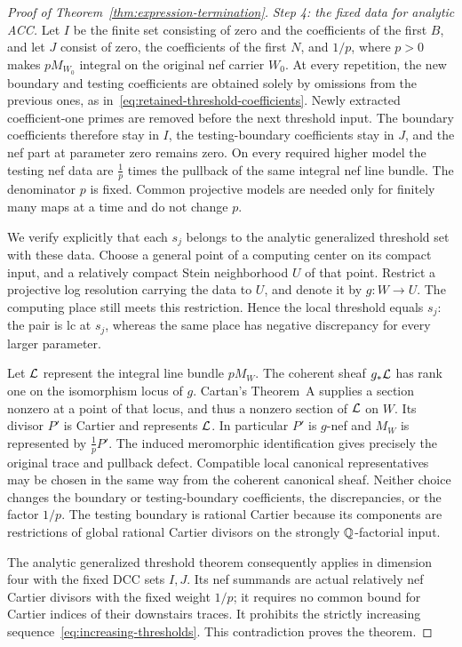 \begin{proof}[Proof of Theorem~\ref{thm:expression-termination}]
\smallskip\noindent
\emph{Step 4: the fixed data for analytic ACC.}
Let $I$ be the finite set consisting of zero and the coefficients of the
first $B$, and let $J$ consist of zero, the coefficients of the first
$N$, and $1/p$, where $p>0$ makes $pM_{W_0}$ integral on the
original nef carrier $W_0$.  At every repetition, the new boundary and testing
coefficients are obtained solely by omissions from the previous ones,
as in~\eqref{eq:retained-threshold-coefficients}.  Newly extracted
coefficient-one primes are removed before the next threshold input.
The boundary coefficients therefore stay in $I$, the testing-boundary
coefficients stay in $J$, and the nef part at parameter zero remains
zero.  On every required higher model the testing nef data are
$\frac1p$ times the pullback of the same integral nef line bundle.
The denominator $p$ is fixed.  Common projective models are needed only
for finitely many maps at a time and do not change $p$.

We verify explicitly that each $s_j$ belongs to the analytic generalized
threshold set with these data.  Choose a general point of a computing
center on its compact input, and a relatively compact Stein neighborhood
$U$ of that point.  Restrict a projective log resolution carrying the
data to $U$, and denote it by $g:W\to U$.  The computing place still
meets this restriction.  Hence the local threshold equals $s_j$: the
pair is lc at $s_j$, whereas the same place has negative discrepancy
for every larger parameter.

Let $\mathcal L$ represent the integral line bundle $pM_W$.  The coherent sheaf
$g_*\mathcal L$ has rank one on the isomorphism locus of $g$.  Cartan's
Theorem~A supplies a section nonzero at a point of that locus, and thus
a nonzero section of $\mathcal L$ on $W$.  Its divisor $P'$ is Cartier and
represents $\mathcal L$.  In particular $P'$ is $g$-nef and $M_W$ is represented
by $\frac1pP'$.  The induced meromorphic identification gives precisely
the original trace and pullback defect.  Compatible local canonical
representatives may be chosen in the same way from the coherent
canonical sheaf.  Neither choice changes the boundary or testing-boundary
coefficients, the discrepancies, or the factor $1/p$.  The testing
boundary is rational Cartier because its components are restrictions
of global rational Cartier divisors on the strongly $\mathbb Q$-factorial input.

The analytic generalized threshold theorem
\cite[Theorem~1.1 and Theorem~3.3; see also Definition~2.3 and
Remark~2.5]{HXACC2023} consequently applies in dimension four with the
fixed DCC sets $I,J$.  Its nef summands are actual relatively nef Cartier
divisors with the fixed weight $1/p$; it requires no common bound for
Cartier indices of their downstairs traces.  It prohibits the strictly
increasing sequence~\eqref{eq:increasing-thresholds}.  This contradiction
proves the theorem.
\end{proof}
